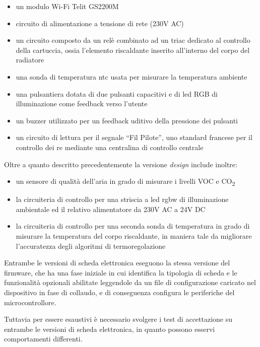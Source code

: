 \documentclass[12pt,a4paper,twoside,titlepage]{book}
\begin{document}
\begin{itemize}
    \item un modulo Wi-Fi Telit GS2200M
    \item circuito di alimentazione a tensione di rete (230V AC)
    \item un circuito composto da un relè combinato ad un triac dedicato al controllo della
        cartuccia, ossia l'elemento riscaldante inserito all'interno del corpo del radiatore
    \item una sonda di temperatura \Gls{ntc} usata per misurare la temperatura ambiente
    \item una pulsantiera dotata di due pulsanti capacitivi e di \acrshort{led} RGB di illuminazione
        come feedback verso l'utente
    \item un buzzer utilizzato per un feedback uditivo della pressione dei pulsanti
    \item un circuito di lettura per il segnale ``Fil Pilote'', uno standard francese 
        per il controllo dei \acrshort{re} mediante una centralina di controllo centrale
\end{itemize}
    
Oltre a quanto descritto precedentemente la versione \textit{design} include inoltre:
\begin{itemize}
    \item un sensore di qualità dell'aria in grado di
        misurare i livelli VOC e CO\textsubscript{2}
    \item la circuiteria di controllo per una striscia a \acrshort{led} \acrshort{rgbw} di illuminazione ambientale
        ed il relativo alimentatore da 230V AC a 24V DC
    \item la circuiteria di controllo per una seconda sonda di temperatura in grado di
        misurare la temperatura del corpo riscaldante, in maniera tale da migliorare
        l'accuratezza degli algoritmi di termoregolazione
\end{itemize}
    
Entrambe le versioni di scheda elettronica eseguono la stessa versione del \gls{firmware},
che ha una fase iniziale in cui identifica la tipologia di scheda e le funzionalità
opzionali abilitate leggendole da un file di configurazione caricato nel dispositivo
in fase di collaudo, e di conseguenza configura le periferiche del microcontrollore.

Tuttavia per essere esaustivi è necessario svolgere i test di accettazione su entrambe
le versioni di scheda elettronica, in quanto possono esservi comportamenti differenti.
\end{document}
